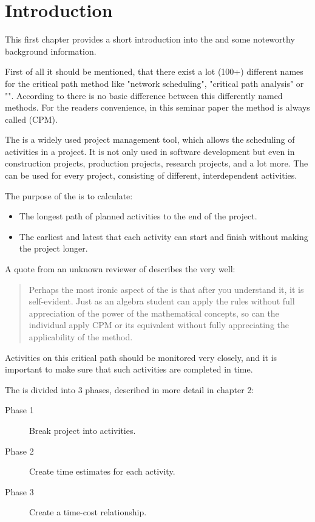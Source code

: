\section{Introduction}

This first chapter provides a short introduction into the \cpm{} and some noteworthy
background information.

First of all it should be mentioned, that there exist a lot (100+) different names for  the critical
path method like "network scheduling", "critical path analysis" or "\cpm{}". According
to \cite{dua} there is no basic difference between this differently named methods. For the readers
convenience, in this seminar paper the method is always called \cpm{} (CPM). 

The \cpm{} is a widely used project management tool, which allows the scheduling of
activities in a project. It is not only used in software development but even in construction
projects, production projects, research projects, and a lot more. The \cpm{} can be
used for every project, consisting of different, interdependent activities.  

The purpose of the \cpm{} is to calculate\cite{santiago}:
\begin{itemize}
  \item The longest path of planned activities to the end of the project.
  \item The earliest and latest that each activity can start and finish without making the project longer.
\end{itemize}

A quote from an unknown reviewer of \cite{obrien} describes the \cpm{} very well:

\begin{quotation}
Perhaps the most ironic aspect of the \cpm{} is that after you understand it, it is
self-evident. Just as an algebra student can apply the rules without full appreciation of the power
of the mathematical concepts, so can the individual apply CPM or its equivalent without fully
appreciating the applicability of the method.
\end{quotation}

Activities on this critical path should be monitored very closely, and it is important to make sure
that such activities are completed in time. 

The \cpm{} is divided into 3 phases, described in more detail in chapter 2:
\begin{description}
  \item[Phase 1] Break project into activities.
  \item[Phase 2] Create time estimates for each activity. 
  \item[Phase 3] Create a time-cost relationship.
\end{description}

